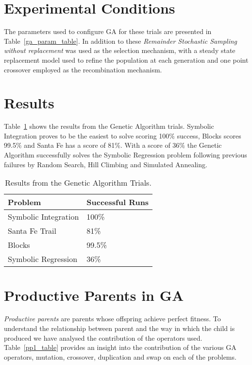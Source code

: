 \section{Experimental Conditions}
The parameters used to configure GA for these trials are presented in Table~\ref{ga_param_table}. In addition to these \emph{Remainder Stochastic Sampling without replacement} was used as the selection mechanism, with a steady state replacement model used to refine the population at each generation and one point crossover employed as the recombination mechanism.

\section{Results}

Table~\ref{ga_results_table} shows the results from the Genetic Algorithm trials. Symbolic Integration proves to be the easiest to solve scoring 100\% success, Blocks scores 99.5\% and Santa Fe has a score of 81\%. With a score of 36\% the Genetic Algorithm successfully solves the Symbolic Regression problem following previous failures by Random Search, Hill Climbing and Simulated Annealing.

\begin{table}[h]
\begin{center}
\begin{tabular}{|l|l|}
\hline
Problem & Successful Runs \\
\hline
Symbolic Integration & 100\% \\
Santa Fe Trail & 81\% \\
Blocks & 99.5\% \\
Symbolic Regression & 36\% \\
\hline
\end{tabular}
\caption{\label{ga_results_table} Results from the Genetic Algorithm Trials.}
\end{center}
\end{table}



\section{Productive Parents in GA}
\emph{Productive parents} are parents whose offspring achieve perfect fitness. To understand the relationship between parent and the way in which the child is produced we have analysed the contribution of the operators used. Table~\ref{pp1_table} provides an insight into the contribution of the various GA operators, mutation, crossover, duplication and swap on each of the problems. 

